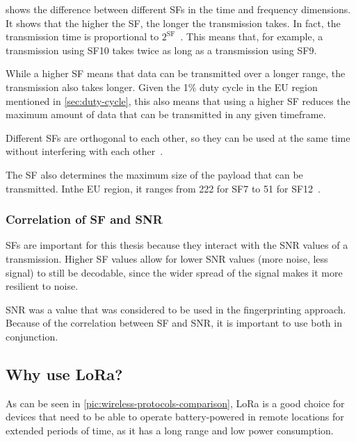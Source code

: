  shows the difference between different \aclp{SF} in the time and frequency dimensions.
It shows that the higher the \ac{SF}, the longer the transmission takes.
In fact, the transmission time is proportional to $2^{\text{SF}}$~\cite{sakshama_ghoslya_lora_2017}.
This means that, for example, a transmission using \ac{SF}10 takes twice as long as a transmission using \ac{SF}9.

While a higher \acl{SF} means that data can be transmitted over a longer range, the transmission also takes longer.
Given the 1\% duty cycle in the \ac{EU} region mentioned in \cref{sec:duty-cycle}, this also means that using a higher \acl{SF} reduces the maximum amount of data that can be transmitted in any given timeframe.

Different \aclp{SF} are orthogonal to each other, so they can be used at the same time without interfering with each other~\cite{the_things_network_spreading_2023}.

The \ac{SF} also determines the maximum size of the payload that can be transmitted.
Inthe \ac{EU} region, it ranges from \SI{222}{\byte} for \ac{SF}7 to \SI{51}{\byte} for \ac{SF}12~\cite[p. 10f]{lora_alliance_inc_lorawan_regional_2017}.

\subsubsection{Correlation of \acs{SF} and \acs{SNR}}\label{sec:sf-snr-correlation}

\aclp{SF} are important for this thesis because they interact with the \ac{SNR} values of a transmission.
Higher \ac{SF} values allow for lower \ac{SNR} values (more noise, less signal) to still be decodable, since the wider spread of the signal makes it more resilient to noise.

\ac{SNR} was a value that was considered to be used in the fingerprinting approach.
Because of the correlation between \acl{SF} and \acl{SNR}, it is important to use both in conjunction.

\subsection{Why use \acs{LoRa}?}

As can be seen in \cref{pic:wireless-protocols-comparison}, \ac{LoRa} is a good choice for devices that need to be able to operate battery-powered in remote locations for extended periods of time, as it has a long range and low power consumption.

